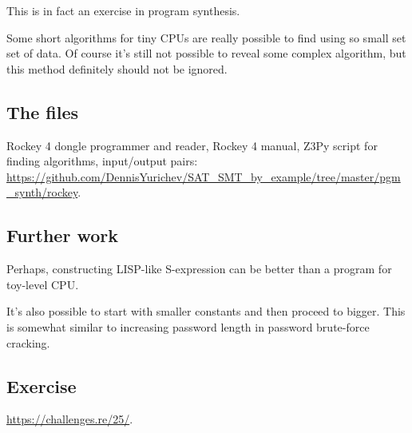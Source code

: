 This is in fact an exercise in program synthesis.

Some short algorithms for tiny \ac{CPU}s are really possible to find using so small set set of data.
Of course it's still not possible to reveal some complex algorithm,
but this method definitely should not be ignored.

\subsection{The files}

Rockey 4 dongle programmer and reader, Rockey 4 manual, Z3Py script for finding algorithms, input/output pairs:
\url{https://github.com/DennisYurichev/SAT_SMT_by_example/tree/master/pgm_synth/rockey}.

\subsection{Further work}

Perhaps, constructing LISP-like S-expression can be better than a program for toy-level CPU.

It's also possible to start with smaller constants and then proceed to bigger.
This is somewhat similar to increasing password length in password brute-force cracking.

\subsection{Exercise}

\url{https://challenges.re/25/}.


